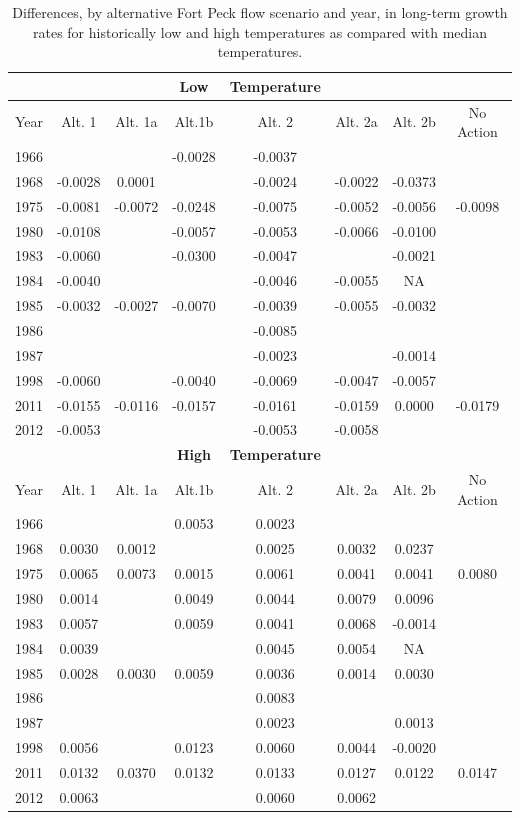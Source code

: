 \documentclass[12pt]{article}
\begin{document}
\newpage

\begin{table}[h]
\caption{Differences, by alternative Fort Peck flow scenario and year, in long-term growth rates for historically low and high temperatures as compared with median temperatures.}
\centering
\begin{tabular}{cccccccc}
\hline
&&& \textbf{Low} & \textbf{Temperature} &&&\\
\hline
Year & Alt. 1 & Alt. 1a & Alt.1b & Alt. 2 & Alt. 2a & Alt. 2b & No Action\\ 
1966 & & & -0.0028 & -0.0037 & & & \\
1968 & -0.0028	& 0.0001	&		&	-0.0024	&	-0.0022	&	-0.0373	&	\\
1975 & -0.0081	& -0.0072	& -0.0248	&	-0.0075	&	-0.0052	&	-0.0056	&	-0.0098\\
1980 &	-0.0108	&		&	-0.0057	&	-0.0053	&	-0.0066	&	-0.0100 & \\
1983 &	-0.0060	&		&	-0.0300	&	-0.0047	&		&	-0.0021	& \\
1984 &	-0.0040	&		&		&	-0.0046	&	-0.0055	& NA & \\
1985 &	-0.0032	&	-0.0027	&	-0.0070	&	-0.0039	&	-0.0055	& -0.0032 &	\\
1986 &		&		&		&	-0.0085	&		&		& \\
1987 &		&		&		&	-0.0023	&		&	-0.0014	& \\
1998 &	-0.0060	&		&	-0.0040	&	-0.0069	&	-0.0047	& -0.0057 & \\
2011 &	-0.0155	&	-0.0116	&	-0.0157	&	-0.0161	& -0.0159 & 0.0000 &	-0.0179\\
2012 & -0.0053 & & & -0.0053 & -0.0058 & & \\		
\hline
&&& \textbf{High} & \textbf{Temperature} &&&\\
\hline
Year  & Alt. 1 & Alt. 1a & Alt.1b & Alt. 2 & Alt. 2a & Alt. 2b & No Action\\ 
1966	&&&	0.0053	&	0.0023	&		&		& \\
1968	& 0.0030 &	0.0012	&		&	0.0025	&	0.0032	&	0.0237	& \\
1975	& 0.0065 & 0.0073	& 0.0015 &	0.0061	&	0.0041	&	0.0041	&	0.0080\\
1980	& 0.0014 & & 0.0049	&	0.0044	&	0.0079	&	0.0096	& \\
1983	& 0.0057 & & 0.0059	&	0.0041	&	0.0068	&	-0.0014	& \\
1984	& 0.0039 & & &	0.0045	&	0.0054	&	NA	& \\
1985	&0.0028 & 0.0030 &	0.0059	&	0.0036	&	0.0014	&	0.0030	& \\
1986	& & & & 0.0083	&		&		& \\
1987	& & & & 0.0023	&		&	0.0013	& \\
1998	& 0.0056 & & 0.0123 &	0.0060	&	0.0044	&	-0.0020	& \\
2011	& 0.0132 & 0.0370 & 0.0132 &	0.0133	&	0.0127	&	0.0122	&	0.0147\\
2012	& 0.0063 & & & 0.0060 & 0.0062	& & \\
	
\hline
\end{tabular}
\end{table}
\end{document}
